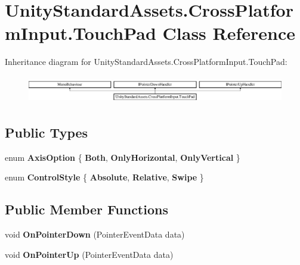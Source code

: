 \hypertarget{class_unity_standard_assets_1_1_cross_platform_input_1_1_touch_pad}{}\section{Unity\+Standard\+Assets.\+Cross\+Platform\+Input.\+Touch\+Pad Class Reference}
\label{class_unity_standard_assets_1_1_cross_platform_input_1_1_touch_pad}
Inheritance diagram for Unity\+Standard\+Assets.\+Cross\+Platform\+Input.\+Touch\+Pad\+:\begin{figure}[H]
\begin{center}
\leavevmode
\includegraphics[height=1.216069cm]{class_unity_standard_assets_1_1_cross_platform_input_1_1_touch_pad}
\end{center}
\end{figure}
\subsection*{Public Types}
\begin{DoxyCompactItemize}
\item 
enum {\bfseries Axis\+Option} \{ {\bfseries Both}, 
{\bfseries Only\+Horizontal}, 
{\bfseries Only\+Vertical}
 \}\hypertarget{class_unity_standard_assets_1_1_cross_platform_input_1_1_touch_pad_a97d0cfd4e00c26253919746e84ebb7e5}{}\label{class_unity_standard_assets_1_1_cross_platform_input_1_1_touch_pad_a97d0cfd4e00c26253919746e84ebb7e5}

\item 
enum {\bfseries Control\+Style} \{ {\bfseries Absolute}, 
{\bfseries Relative}, 
{\bfseries Swipe}
 \}\hypertarget{class_unity_standard_assets_1_1_cross_platform_input_1_1_touch_pad_ab4c68ac6f2b8a41c5029c105833ebfb6}{}\label{class_unity_standard_assets_1_1_cross_platform_input_1_1_touch_pad_ab4c68ac6f2b8a41c5029c105833ebfb6}

\end{DoxyCompactItemize}
\subsection*{Public Member Functions}
\begin{DoxyCompactItemize}
\item 
void {\bfseries On\+Pointer\+Down} (Pointer\+Event\+Data data)\hypertarget{class_unity_standard_assets_1_1_cross_platform_input_1_1_touch_pad_a8b4472a5a1e14f366343555bde2a0d5f}{}\label{class_unity_standard_assets_1_1_cross_platform_input_1_1_touch_pad_a8b4472a5a1e14f366343555bde2a0d5f}

\item 
void {\bfseries On\+Pointer\+Up} (Pointer\+Event\+Data data)\hypertarget{class_unity_standard_assets_1_1_cross_platform_input_1_1_touch_pad_a4dba9a8b6dfe34618e48f1b152bc1eba}{}\label{class_unity_standard_assets_1_1_cross_platform_input_1_1_touch_pad_a4dba9a8b6dfe34618e48f1b152bc1eba}

\end{DoxyCompactItemize}
